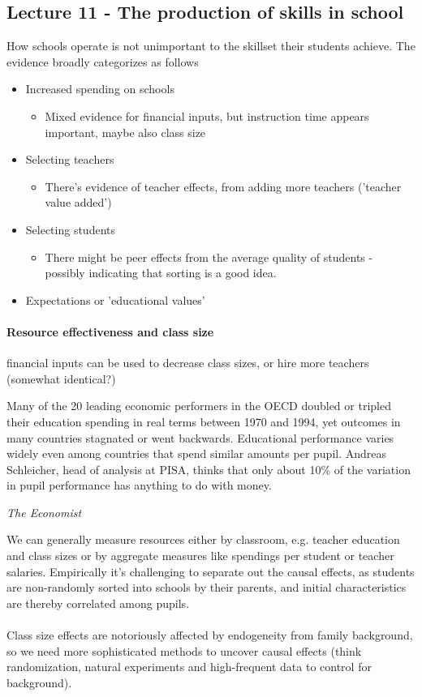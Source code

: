 \documentclass[12pt, a4paper]{article}
\begin{document}
\begin{multicols}{2}
\subsection{Lecture 11 - The production of skills in school}
How schools operate is not unimportant to the skillset their students achieve. The evidence broadly categorizes as follows
\begin{itemize}
\item Increased spending on schools
\begin{itemize}
\item Mixed evidence for financial inputs, but instruction time appears important, maybe also class size
\end{itemize}
\item Selecting teachers
\begin{itemize}
\item There's evidence of teacher effects, from adding more teachers ('teacher value added')
\end{itemize}
\item Selecting students
\begin{itemize}
\item There might be peer effects from the average quality of students - possibly indicating that sorting is a good idea.
\end{itemize}
\item Expectations or 'educational values'
\end{itemize}
\paragraph{Resource effectiveness and class size} financial inputs can be used to decrease class sizes, or hire more teachers (somewhat identical?)
\epigraph{Many of the 20 leading economic performers in the OECD doubled or tripled their education spending in real terms between 1970 and 1994, yet outcomes in many countries stagnated or went backwards. Educational performance varies widely even among countries that spend similar amounts per pupil. Andreas Schleicher, head of analysis at PISA, thinks that only about 10\% of the variation in pupil performance has anything to do with money.}{\textit{The Economist}}
We can generally measure resources either by classroom, e.g. teacher education and class sizes or by aggregate measures like spendings per student or teacher salaries. Empirically it's challenging to separate out the causal effects, as students are non-randomly sorted into schools by their parents, and initial characteristics are thereby correlated among pupils.
\\ \\
Class size effects are notoriously affected by endogeneity from family background, so we need more sophisticated methods to uncover causal effects (think randomization, natural experiments and high-frequent data to control for background).


\end{multicols}
\end{document}

